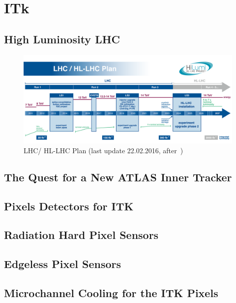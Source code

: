 \chapter{ITk}
\label{chap:ITk}

\section{High Luminosity LHC}

\begin{figure}[!htpb]
\centering
\includegraphics[width=1.0\textwidth]{HL-LHC-plan-2016-01.png}
\caption{\label{fig:HL-LHC-plan-2016-01}LHC/ HL-LHC Plan (last update 22.02.2016, after~\cite{HL_LHC})}
\end{figure}

\section{The Quest for a New ATLAS Inner Tracker}

\section{Pixels Detectors for ITK}

\section{Radiation Hard Pixel Sensors}
\label{sec:radhardpixels}
\section{Edgeless Pixel Sensors}
\label{sec:edgeless}

\section{Microchannel Cooling for the ITK Pixels}
